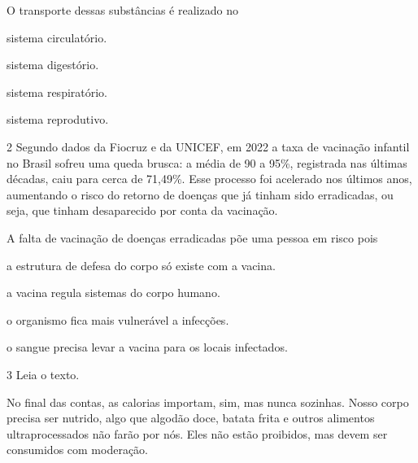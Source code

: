 O transporte dessas substâncias é realizado no

\begin{minipage}{.5\textwidth}
\begin{escolha}
\item sistema circulatório.

\item sistema digestório.

\item sistema respiratório.

\item sistema reprodutivo.
\end{escolha}
\end{minipage}


\pagebreak
\num{2} Segundo dados da Fiocruz e da UNICEF, em 2022 a taxa de
vacinação infantil no Brasil sofreu uma queda brusca: a média de 90 a 95\%,
registrada nas últimas décadas, caiu para cerca de 71,49\%. Esse processo
foi acelerado nos últimos anos, aumentando o risco do retorno de doenças
que já tinham sido erradicadas, ou seja, que tinham desaparecido por conta
da vacinação. 

A falta de vacinação de doenças erradicadas põe uma pessoa em risco pois

\begin{escolha}
\item a estrutura de defesa do corpo só existe com a vacina.

\item a vacina regula sistemas do corpo humano.

\item o organismo fica mais vulnerável a infecções.

\item o sangue precisa levar a vacina para os locais infectados.
\end{escolha}



\num{3} Leia o texto.

\begin{myquote}
No final das contas, as calorias importam, sim, mas nunca sozinhas.
Nosso corpo precisa ser nutrido, algo que algodão doce, batata frita e
outros alimentos ultraprocessados não farão por nós. Eles não estão
proibidos, mas devem ser consumidos com moderação.

\end{myquote}

